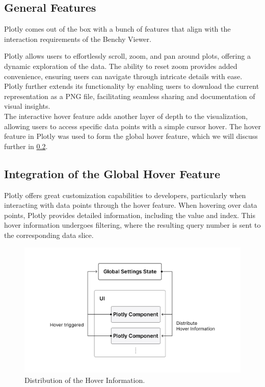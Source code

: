 \subsection{General Features}
Plotly comes out of the box with a bunch of features that align with the interaction requirements of the Benchy Viewer.

Plotly allows users to effortlessly scroll, zoom, and pan around plots, offering a dynamic exploration of the data. The ability to reset zoom provides added convenience, ensuring users can navigate through intricate details with ease.\\
Plotly further extends its functionality by enabling users to download the current representation as a PNG file, facilitating seamless sharing and documentation of visual insights.\\
The interactive hover feature adds another layer of depth to the visualization, allowing users to access specific data points with a simple cursor hover. The hover feature in Plotly was used to form the global hover feature, which we will discuss further in \ref{sec:plotly-hover}.





\subsection{Integration of the Global Hover Feature}\label{sec:plotly-hover}

Plotly offers great customization capabilities to developers, particularly when interacting with data points through the hover feature. When hovering over data points, Plotly provides detailed information, including the value and index. This hover information undergoes filtering, where the resulting query number is sent to the corresponding data slice. 

\begin{figure}[h]
  \centering
  \includegraphics[width=0.8\linewidth]{figures/global-hover.png}
  \caption{Distribution of the Hover Information.}
  \label{fig:global-hover}
\end{figure}

